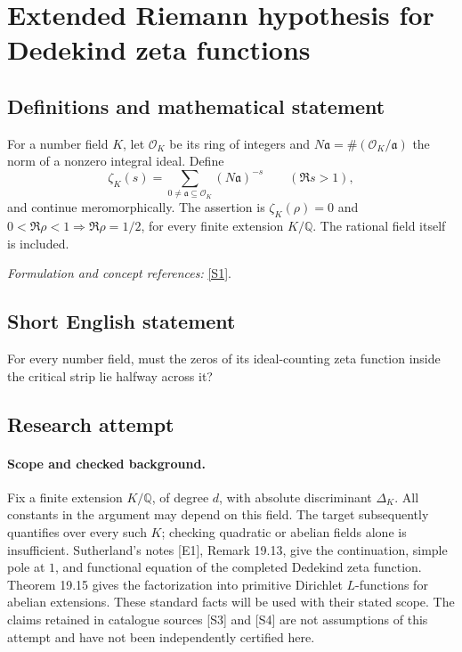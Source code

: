 \documentclass[11pt]{article}
\begin{document}
\section*{\texorpdfstring{Extended Riemann hypothesis for Dedekind zeta functions}{Extended Riemann hypothesis for Dedekind zeta functions}}\label{statement}
\subsection{Definitions and mathematical statement}
For a number field $K$, let $\mathcal O_K$ be its ring of integers and $N\mathfrak a=\#(\mathcal O_K/\mathfrak a)$ the norm of a nonzero integral ideal. Define
\[
 \zeta_K(s)=\sum_{0\ne\mathfrak a\subseteq\mathcal O_K}(N\mathfrak a)^{-s}
 \qquad(\Re s>1),
\]
and continue meromorphically. The assertion is $\zeta_K(\rho)=0$ and $0<\Re\rho<1\Rightarrow\Re\rho=1/2$, for every finite extension $K/{\mathbb{Q}}$. The rational field itself is included.
\par\smallskip\textit{Formulation and concept references:} \href{https://www.aimath.org/WWN/rh/articles/html/18a/}{[S1]}.

\subsection{Short English statement}
For every number field, must the zeros of its ideal-counting zeta function inside the critical strip lie halfway across it?
\subsection{Research attempt}

\paragraph{Scope and checked background.}
Fix a finite extension $K/\mathbb Q$, of degree $d$, with absolute
discriminant $\Delta_K$. All constants in the argument may depend on this
field. The target subsequently quantifies over every such $K$; checking
quadratic or abelian fields alone is insufficient. Sutherland's notes
[E1], Remark 19.13, give the continuation, simple pole at $1$, and
functional equation of the completed Dedekind zeta function. Theorem 19.15
gives the factorization into primitive Dirichlet $L$-functions for abelian
extensions. These standard facts will be used with their stated scope.
The claims retained in catalogue sources [S3] and [S4] are not assumptions
of this attempt and have not been independently certified here.
\end{document}
